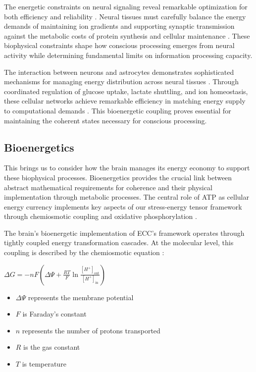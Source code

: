 The energetic constraints on neural signaling reveal remarkable optimization for both efficiency and reliability \cite{Attwell2001}. Neural tissues must carefully balance the energy demands of maintaining ion gradients and supporting synaptic transmission against the metabolic costs of protein synthesis and cellular maintenance \cite{Harris2012}. These biophysical constraints shape how conscious processing emerges from neural activity while determining fundamental limits on information processing capacity.

The interaction between neurons and astrocytes demonstrates sophisticated mechanisms for managing energy distribution across neural tissues \cite{Hertz2007}. Through coordinated regulation of glucose uptake, lactate shuttling, and ion homeostasis, these cellular networks achieve remarkable efficiency in matching energy supply to computational demands \cite{Magistretti2015}. This bioenergetic coupling proves essential for maintaining the coherent states necessary for conscious processing.

\subsection{Bioenergetics}

This brings us to consider how the brain manages its energy economy to support these biophysical processes. Bioenergetics provides the crucial link between abstract mathematical requirements for coherence and their physical implementation through metabolic processes. The central role of ATP as cellular energy currency implements key aspects of our stress-energy tensor framework through chemiosmotic coupling and oxidative phosphorylation \cite{Mitchell1961}.

The brain's bioenergetic implementation of ECC's framework operates through tightly coupled energy transformation cascades. At the molecular level, this coupling is described by the chemiosmotic equation \cite{Nicholls2013}:

$\Delta G = -nF(\Delta \Psi + \frac{RT}{F}\ln\frac{[H^+]_{\text{out}}}{[H^+]_{\text{in}}})$

\begin{itemize}
\item $\Delta \Psi$ represents the membrane potential
\item $F$ is Faraday's constant
\item $n$ represents the number of protons transported
\item $R$ is the gas constant
\item $T$ is temperature
\end{itemize}

